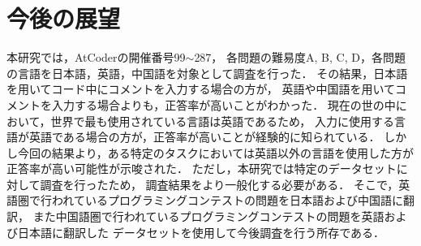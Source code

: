 \section{今後の展望\label{future_work}}
  本研究では，AtCoder\cite{AtCoder}の開催番号99${\sim}$287，
  各問題の難易度A, B, C, D，各問題の言語を日本語，英語，中国語を対象として調査を行った．
  その結果，日本語を用いてコード中にコメントを入力する場合の方が，
  英語や中国語を用いてコメントを入力する場合よりも，正答率が高いことがわかった．
  現在の世の中において，世界で最も使用されている言語は英語である\cite{Ethnologue}ため，
  入力に使用する言語が英語である場合の方が，正答率が高いことが経験的に知られている．
  しかし今回の結果より，ある特定のタスクにおいては英語以外の言語を使用した方が正答率が高い可能性が示唆された．
  ただし，本研究では特定のデータセットに対して調査を行ったため，
  調査結果をより一般化する必要がある．
  そこで，英語圏で行われているプログラミングコンテストの問題を日本語および中国語に翻訳，
  また中国語圏で行われているプログラミングコンテストの問題を英語および日本語に翻訳した
  データセットを使用して今後調査を行う所存である．

